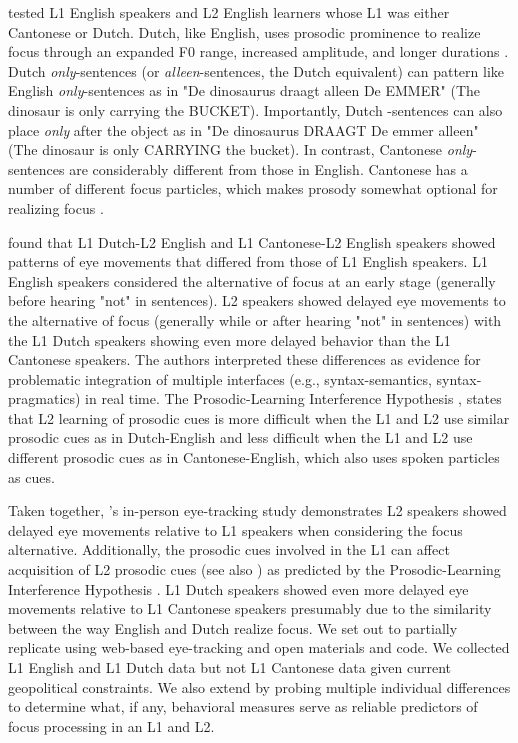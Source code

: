 \cite{Ge2021} tested L1 English speakers and L2 English learners whose L1 was either Cantonese or Dutch. Dutch, like English, uses prosodic prominence to realize focus through an expanded F0 range, increased amplitude, and longer durations \citep{dimitrova2010focus}. Dutch \textit{only}-sentences (or \textit{alleen}-sentences, the Dutch equivalent) can pattern like English \textit{only}-sentences as in "De dinosaurus draagt alleen De EMMER" (The dinosaur is only carrying the BUCKET). Importantly, Dutch -sentences can also place \textit{only} after the object as in "De dinosaurus DRAAGT De emmer alleen" (The dinosaur is only CARRYING the bucket). In contrast, Cantonese \textit{only}-sentences are considerably different from those in English. Cantonese has a number of different focus particles, which makes prosody somewhat optional for realizing focus \citep{lee2019focus, wu2010prosodic, ge2024bilingual, fung2000final}. 

\cite{Ge2021} found that L1 Dutch-L2 English and L1 Cantonese-L2 English speakers showed patterns of eye movements that differed from those of L1 English speakers. L1 English speakers considered the alternative of focus at an early stage (generally before hearing "not" in sentences). L2 speakers showed delayed eye movements to the alternative of focus (generally while or after hearing "not" in sentences) with the L1 Dutch speakers showing even more delayed behavior than the L1 Cantonese speakers. The authors interpreted these differences as evidence for problematic integration of multiple interfaces (e.g., syntax-semantics, syntax-pragmatics) in real time. The Prosodic-Learning Interference Hypothesis \citep{tremblay2016effects, tremblay2021re}, states that L2 learning of prosodic cues is more difficult when the L1 and L2 use similar prosodic cues as in Dutch-English and less difficult when the L1 and L2 use different prosodic cues as in Cantonese-English, which also uses spoken particles as cues. 

Taken together, \cite{Ge2021}'s in-person eye-tracking study demonstrates L2 speakers showed delayed eye movements relative to L1 speakers when considering the focus alternative. Additionally, the prosodic cues involved in the L1 can affect acquisition of L2 prosodic cues (see also \cite{ge2021comprehension}) as predicted by the Prosodic-Learning Interference Hypothesis \cite{tremblay2016effects}. L1 Dutch speakers showed even more delayed eye movements relative to L1 Cantonese speakers presumably due to the similarity between the way English and Dutch realize focus. We set out to partially replicate \cite{Ge2021} using web-based eye-tracking and open materials and code. We collected L1 English and L1 Dutch data but not L1 Cantonese data given current geopolitical constraints. We also extend \cite{Ge2021} by probing multiple individual differences to determine what, if any, behavioral measures serve as reliable predictors of focus processing in an L1 and L2. 

